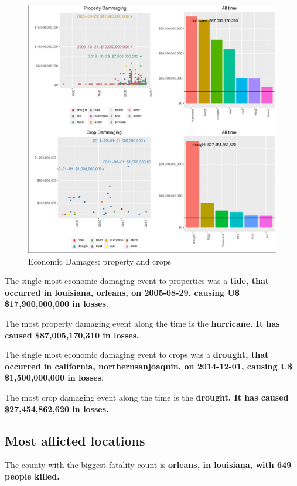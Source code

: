 \documentclass[]{article}
\begin{document}
\begin{figure}[htbp]
\centering
\includegraphics{readme_files/figure-latex/economic-plot-1.pdf}
\caption{Economic Damages: property and crops}
\end{figure}

The single most economic damaging event to properties was a
\textbf{tide, that occurred in louisiana, orleans, on 2005-08-29,
causing U\$ \$17,900,000,000 in losses}.

The most property damaging event along the time is the
\textbf{hurricane. It has caused \$87,005,170,310 in losses.}

The single most economic damaging event to crops was a \textbf{drought,
that occurred in california, northernsanjoaquin, on 2014-12-01, causing
U\$ \$1,500,000,000 in losses}.

The most crop damaging event along the time is the \textbf{drought. It
has caused \$27,454,862,620 in losses.}

\subsection{Most aflicted locations}\label{most-aflicted-locations-1}

The county with the biggest fatality count is \textbf{orleans, in
louisiana, with 649 people killed.}
\end{document}
